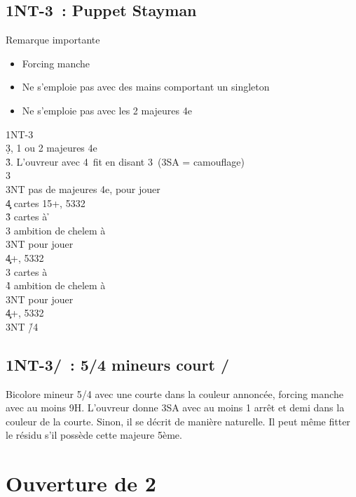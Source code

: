 \documentclass[a4paper]{article}
\begin{document}
\subsection{1NT-3\pdfc\ : Puppet Stayman}

Remarque importante

\begin{itemize}
\item Forcing manche

\item Ne s'emploie pas avec des mains comportant un singleton 

\item Ne s'emploie pas avec les 2 majeures 4e

\end{itemize}

\begin{bidtable}
1NT-3\c\\
3\d {}, 1 ou 2 majeures 4e\+\\
3\h {}\s . L'ouvreur avec 4\s\ fit en disant 3\s\ (3SA = camouflage)\\
3\s {}\h \\
3NT \> pas de majeures 4e, pour jouer\\
4\c\d {} cartes 15+, 5332\-\\
3\h {} cartes à \h \+\\
3\s \> ambition de chelem à \h \\
3NT \> pour jouer\\
4\c\d {}+, 5332\-\\
3\s {} cartes à \s \+\\
4\h \> ambition de chelem à \s \\
3NT \> pour jouer\\
4\c\d {}+, 5332\-\\
3NT \h /4\s 
\end{bidtable}

\subsection{1NT-3\pdfh/\pdfs\ : 5/4 mineurs court \pdfh/\pdfs}

Bicolore mineur 5/4 avec une courte dans la couleur annoncée, forcing manche avec au 
moins 9H. L’ouvreur donne 3SA avec au moins 1 arrêt et demi dans la couleur de la courte.
Sinon, il se décrit de manière naturelle. Il peut même fitter le résidu s’il possède cette majeure 5ème.

\section{Ouverture de 2\pdfc}
\end{document}
